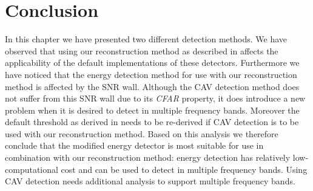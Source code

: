 \documentclass[a4paper, openany, oneside]{memoir}
\begin{document}
\section{Conclusion}
In this chapter we have presented two different detection methods. We have observed that using our reconstruction method as described in  affects the applicability of the default implementations of these detectors.  Furthermore we have noticed that the energy detection method for use with our reconstruction method is affected by the SNR wall. Although the CAV detection method does not suffer from this SNR wall due to its \emph{CFAR} property, it does introduce a new problem when it is desired to detect in multiple frequency bands. Moreover the default threshold as derived in \cite{zheng2009spectrum} needs to be re-derived if CAV detection is to be used with our reconstruction method. Based on this analysis we therefore conclude that the modified energy detector is most suitable for use in combination with our reconstruction method: energy detection has relatively low-computational cost and can be used to detect in multiple frequency bands.  Using CAV detection needs additional analysis to support multiple frequency bands. 
\end{document}
